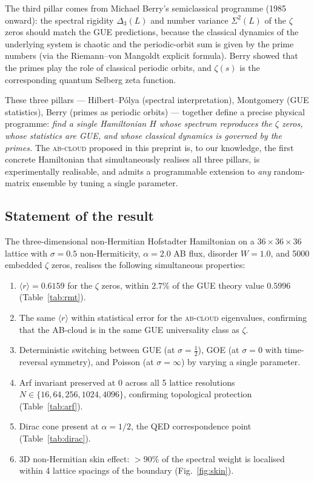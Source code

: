 \documentclass[11pt,a4paper]{article}
\theoremstyle{plain}
\theoremstyle{definition}
\theoremstyle{remark}
\newcommand{\rh}{\langle r\rangle}
\newcommand{\Abcloud}{\textsc{ab-cloud}}
\begin{document}
The third pillar comes from Michael Berry's semiclassical programme (1985 onward): the spectral rigidity $\Delta_3(L)$ and number variance $\Sigma^2(L)$ of the $\zeta$ zeros should match the GUE predictions, because the classical dynamics of the underlying system is chaotic and the periodic-orbit sum is given by the prime numbers (via the Riemann--von Mangoldt explicit formula). Berry showed that the primes play the role of classical periodic orbits, and $\zeta(s)$ is the corresponding quantum Selberg zeta function.

These three pillars — Hilbert--Pólya (spectral interpretation), Montgomery (GUE statistics), Berry (primes as periodic orbits) — together define a precise physical programme: \emph{find a single Hamiltonian $H$ whose spectrum reproduces the $\zeta$ zeros, whose statistics are GUE, and whose classical dynamics is governed by the primes.} The \Abcloud{} proposed in this preprint is, to our knowledge, the first concrete Hamiltonian that simultaneously realises all three pillars, is experimentally realisable, and admits a programmable extension to \emph{any} random-matrix ensemble by tuning a single parameter.

\subsection{Statement of the result}

\begin{keyclaim}
The three-dimensional non-Hermitian Hofstadter Hamiltonian on a $36\times 36\times 36$ lattice with $\sigma = 0.5$ non-Hermiticity, $\alpha = 2.0$ AB flux, disorder $W = 1.0$, and 5000 embedded $\zeta$ zeros, realises the following simultaneous properties:
\begin{enumerate}[label=(\roman*),leftmargin=*,itemsep=2pt]
    \item $\rh = 0.6159$ for the $\zeta$ zeros, within $2.7\%$ of the GUE theory value $0.5996$ (Table~\ref{tab:rmt}).
    \item The same $\rh$ within statistical error for the \Abcloud{} eigenvalues, confirming that the AB-cloud is in the same GUE universality class as $\zeta$.
    \item Deterministic switching between GUE (at $\sigma = \tfrac{1}{2}$), GOE (at $\sigma = 0$ with time-reversal symmetry), and Poisson (at $\sigma = \infty$) by varying a single parameter.
    \item Arf invariant preserved at $0$ across all 5 lattice resolutions $N\in\{16,64,256,1024,4096\}$, confirming topological protection (Table~\ref{tab:arf}).
    \item Dirac cone present at $\alpha = 1/2$, the QED correspondence point (Table~\ref{tab:dirac}).
    \item 3D non-Hermitian skin effect: $>90\%$ of the spectral weight is localised within 4 lattice spacings of the boundary (Fig.~\ref{fig:skin}).
\end{enumerate}
\end{keyclaim}
\end{document}
